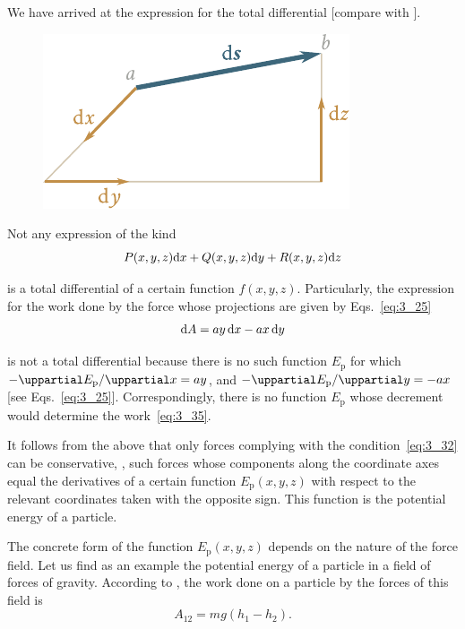 \noindent
We have arrived at the expression for the total differential [compare with ].

\begin{figure}[t]
	\begin{center}
		\includegraphics[scale=0.95]{figures/ch_03/fig_3_9.pdf}
		\caption[]{}
		\label{fig:3_9}
	\end{center}
	\vspace{-0.7cm}
\end{figure}

Not any expression of the kind
\begin{equation*}
P(x,y,z)\mathrm{d} x + Q(x,y,z)\mathrm{d} y + R(x,y,z)\mathrm{d} z
\end{equation*}

\noindent
is a total differential of a certain function $f(x,y,z)$. Particularly, the expression for the work done by the force whose projections are given by Eqs.~\eqref{eq:3_25}
\begin{equation}\label{eq:3_35}
\mathrm{d} A = ay\,\mathrm{d} x - ax\,\mathrm{d} y
\end{equation}

\noindent
is not a total differential because there is no such function $E_{\text{p}}$ for which $-\diffinpartial{E_{\text{p}}}{x}=ay$, and $-\diffinpartial{E_{\text{p}}}{y}=-ax$ [see Eqs.~\eqref{eq:3_25}]. Correspondingly, there is no function $E_{\text{p}}$ whose decrement would determine the work~\eqref{eq:3_35}.

It follows from the above that only forces complying with the condition~\eqref{eq:3_32} can be conservative, \ie, such forces whose components along the coordinate axes equal the derivatives of a certain function $E_{\text{p}}(x,y,z)$ with respect to the relevant coordinates taken with the opposite sign. This function is the potential energy of a particle.

The concrete form of the function $E_{\text{p}}(x,y,z)$ depends on the nature of the force field. Let us find as an example the potential energy of a particle in a field of forces of gravity. According to , the work done on a particle by the forces of this field is
\begin{equation*}
A_{12} = mg(h_1-h_2).
\end{equation*}

